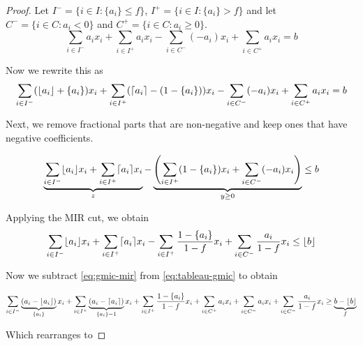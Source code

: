 \begin{proof}

Let $I^- = \{ i \in I : \{a_i\} \leq f\}$, $I^+ = \{i \in I : \{a_i\}> f\}$ and let $C^-  = \{i \in C : a_i < 0\}$ and $C^+ = \{ i \in C : a_i \geq 0\}$.
\begin{equation}
\label{eq:tableau-gmic}
\sum_{i \in I^{-}} a_ix_i + \sum_{i \in I^+} a_i x_i - \sum_{i \in C^-}(-a_i) x_i + \sum_{i \in C^+} a_i x_i = b
\end{equation}

Now we rewrite this as
\begin{equation}
\sum_{i \in I^{-}} (\lfloor a_i \rfloor + \{a_i\} )x_i + \sum_{i \in I^+} (\lceil a_i \rceil - (1- \{a_i\})) x_i   - \sum_{i \in C^-}(-a_i) x_i + \sum_{i \in C^+} a_i x_i = b
\end{equation}

Next, we remove fractional parts that are non-negative and keep ones that have negative coefficients.

\begin{equation}
\underbrace{\sum_{i \in I^{-}} \lfloor a_i \rfloor x_i + \sum_{i \in I^+} \lceil a_i \rceil x_i }_{z} - \underbrace{\left( \sum_{i \in I^+}  (1- \{a_i\}) x_i   + \sum_{i \in C^-}(-a_i) x_i\right)}_{y \geq 0} \leq b
\end{equation}

Applying the MIR cut, we obtain
\begin{equation}
\label{eq:gmic-mir}
\sum_{i \in I^{-}} \lfloor a_i \rfloor x_i + \sum_{i \in I^+} \lceil a_i \rceil x_i - \sum_{i \in I^+}  \frac{1- \{a_i\}}{1-f} x_i   +  \sum_{i \in C^-}\frac{a_i}{1-f} x_i \leq \lfloor b \rfloor
\end{equation}

Now we subtract \eqref{eq:gmic-mir} from \eqref{eq:tableau-gmic} to obtain

\begin{equation}
\label{eq:gmic-close}
\sum_{i \in I^{-}} \underbrace{(a_i - \lfloor a_i \rfloor)}_{\{a_i\}}x_i + \sum_{i \in I^+} \underbrace{(a_i - \lceil a_i \rceil)}_{\{a_i\} - 1}x_i + \sum_{i \in I^+}  \frac{1- \{a_i\}}{1-f} x_i   + \sum_{i \in C^+} a_i x_i + \sum_{i \in C^-} a_i x_i + \sum_{i \in C^-}\frac{a_i}{1-f} x_i \geq \underbrace{b - \lfloor b \rfloor}_{f}
\end{equation}

Which rearranges to 



\end{proof}
